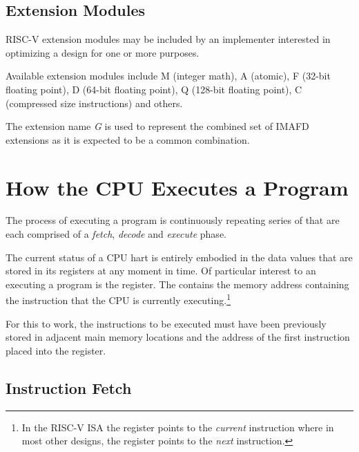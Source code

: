 \subsection{Extension Modules}

RISC-V extension modules may be included by an implementer interested
in optimizing a design for one or more purposes.

%
%
%
%
%
%
Available extension modules include M (integer math), A (atomic),
F (32-bit floating point), D (64-bit floating point), 
Q (128-bit floating point), C (compressed size instructions) and others.

%
The extension name {\em G} is used to represent the combined set of IMAFD
extensions as it is expected to be a common combination.




\section{How the CPU Executes a Program}

The process of executing a program is continuously repeating series of
 that are each comprised
of a {\em fetch}, {\em decode} and {\em execute} phase.
 
The current status of a CPU hart is entirely embodied in the data values that
are stored in its registers at any moment in time.  Of particular interest
to an executing a program is the  register.  The  contains
the memory address containing the instruction that the CPU is currently 
executing.\footnote{In the RISC-V ISA the  register points to the 
{\em current} instruction where in most other designs, the 
register points to the {\em next} instruction.}

For this to work, the instructions to be executed must have been previously 
stored in adjacent main memory locations and the address of the first instruction 
placed into the  register.


\subsection{Instruction Fetch}


